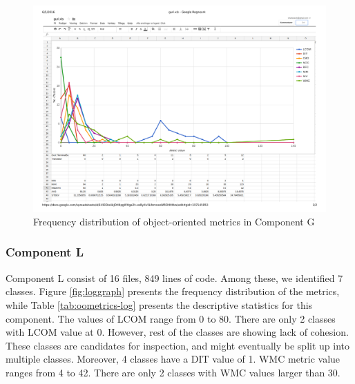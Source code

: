 \begin{landscape}
\setlength\LTleft{-.5in}
	\begin{figure}
	\centering
	\includegraphics[width=\textwidth]{images/pdf/guri.pdf}
	\caption{Frequency distribution of object-oriented metrics in Component G}
	\label{fig:gurigraph}
	\end{figure}
\end{landscape}





\subsubsection{Component L}
Component L consist of 16 files, 849 lines of code. Among these, we identified 7 classes. Figure \ref{fig:loggraph} presents the frequency distribution of the metrics, while Table \ref{tab:oometrics-log} presents the descriptive statistics for this component. The values of LCOM range from 0 to 80. There are only 2 classes with LCOM value at 0. However, rest of the classes are showing lack of cohesion. These classes are candidates for inspection, and might eventually be split up into multiple classes. Moreover, 4 classes have a DIT value of 1. WMC metric value ranges from 4 to 42. There are only 2 classes with WMC values larger than 30.

